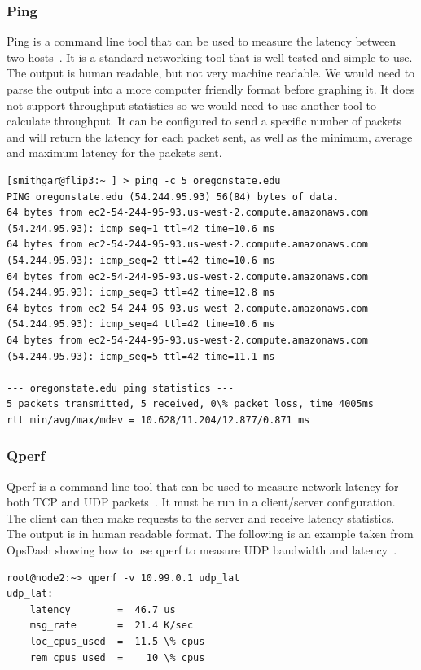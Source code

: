 \documentclass[10pt,letterpaper,onecolumn,draftclsnofoot]{IEEEtran}
\begin{document}
\subsubsection{Ping}
Ping is a command line tool that can be used to measure the latency between two hosts~\cite{ping}.
It is a standard networking tool that is well tested and simple to use.
The output is human readable, but not very machine readable. 
We would need to parse the output into a more computer friendly format before graphing it.
It does not support throughput statistics so we would need to use another tool to calculate throughput.
It can be configured to send a specific number of packets and will return the latency for each packet sent, as well as the minimum, average and maximum latency for the packets sent.
\begin{lstlisting}[caption = Example ping usage, basicstyle=\ttfamily]
[smithgar@flip3:~ ] > ping -c 5 oregonstate.edu
PING oregonstate.edu (54.244.95.93) 56(84) bytes of data.
64 bytes from ec2-54-244-95-93.us-west-2.compute.amazonaws.com (54.244.95.93): icmp_seq=1 ttl=42 time=10.6 ms
64 bytes from ec2-54-244-95-93.us-west-2.compute.amazonaws.com (54.244.95.93): icmp_seq=2 ttl=42 time=10.6 ms
64 bytes from ec2-54-244-95-93.us-west-2.compute.amazonaws.com (54.244.95.93): icmp_seq=3 ttl=42 time=12.8 ms
64 bytes from ec2-54-244-95-93.us-west-2.compute.amazonaws.com (54.244.95.93): icmp_seq=4 ttl=42 time=10.6 ms
64 bytes from ec2-54-244-95-93.us-west-2.compute.amazonaws.com (54.244.95.93): icmp_seq=5 ttl=42 time=11.1 ms

--- oregonstate.edu ping statistics ---
5 packets transmitted, 5 received, 0\% packet loss, time 4005ms
rtt min/avg/max/mdev = 10.628/11.204/12.877/0.871 ms
\end{lstlisting}

\subsubsection{Qperf}
Qperf is a command line tool that can be used to measure network latency for both TCP and UDP packets~\cite{qperf}.
It must be run in a client/server configuration.
The client can then make requests to the server and receive latency statistics.
The output is in human readable format.
The following is an example taken from OpsDash showing how to use qperf to measure UDP bandwidth and latency~\cite{qperf-example}.
\begin{lstlisting}[caption = Using qperf to measure UDP latency,basicstyle=\ttfamily]
root@node2:~> qperf -v 10.99.0.1 udp_lat
udp_lat:
    latency        =  46.7 us
    msg_rate       =  21.4 K/sec
    loc_cpus_used  =  11.5 \% cpus
    rem_cpus_used  =    10 \% cpus
\end{lstlisting}
\end{document}
